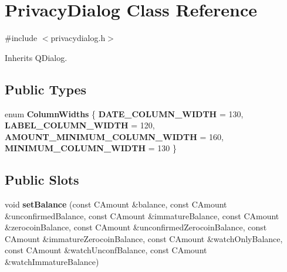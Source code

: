 \hypertarget{class_privacy_dialog}{}\section{Privacy\+Dialog Class Reference}
\label{class_privacy_dialog}


{\ttfamily \#include $<$privacydialog.\+h$>$}



Inherits Q\+Dialog.

\subsection*{Public Types}
\begin{DoxyCompactItemize}
\item 
\mbox{\label{class_privacy_dialog_a768548ddf39161a6404baa8bbd2fccd5}} 
enum {\bfseries Column\+Widths} \{ {\bfseries D\+A\+T\+E\+\_\+\+C\+O\+L\+U\+M\+N\+\_\+\+W\+I\+D\+TH} = 130, 
{\bfseries L\+A\+B\+E\+L\+\_\+\+C\+O\+L\+U\+M\+N\+\_\+\+W\+I\+D\+TH} = 120, 
{\bfseries A\+M\+O\+U\+N\+T\+\_\+\+M\+I\+N\+I\+M\+U\+M\+\_\+\+C\+O\+L\+U\+M\+N\+\_\+\+W\+I\+D\+TH} = 160, 
{\bfseries M\+I\+N\+I\+M\+U\+M\+\_\+\+C\+O\+L\+U\+M\+N\+\_\+\+W\+I\+D\+TH} = 130
 \}
\end{DoxyCompactItemize}
\subsection*{Public Slots}
\begin{DoxyCompactItemize}
\item 
\mbox{\label{class_privacy_dialog_aa2421362d12b1cbf7dd8d6412de5c018}} 
void {\bfseries set\+Balance} (const C\+Amount \&balance, const C\+Amount \&unconfirmed\+Balance, const C\+Amount \&immature\+Balance, const C\+Amount \&zerocoin\+Balance, const C\+Amount \&unconfirmed\+Zerocoin\+Balance, const C\+Amount \&immature\+Zerocoin\+Balance, const C\+Amount \&watch\+Only\+Balance, const C\+Amount \&watch\+Unconf\+Balance, const C\+Amount \&watch\+Immature\+Balance)
\end{DoxyCompactItemize}
